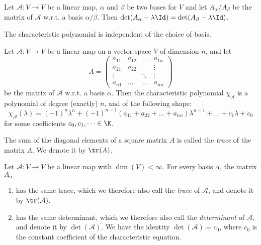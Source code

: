 \begin{theorem}
    Let $\mathcal{A}: V \to V$ be a linear map, $\alpha$ and $\beta$ be two bases for $V$ and let $A_\alpha/A_\beta$ be the matrix of $\mathcal{A}$ w.r.t. a basis $\alpha/\beta$. 
    Then $\det(A_\alpha - \lambda \Id) = \det(A_\beta - \lambda \Id)$.
\end{theorem}

\begin{remark}
    The characteristic polynomial is independent of the choice of basis.
\end{remark}

\begin{theorem}
    Let $\mathcal{A}: V \to V$ be a linear map on a vector space $V$ of dimension $n$, and let
    $$A = \begin{pmatrix} a_{11} & a_{12} & \dots & a_{1n} \\ 
                          a_{21} & a_{22} &       & \vdots \\
                          \vdots &        & \ddots & \vdots \\ a_{n1} & \dots & \dots & a_{nn} \end{pmatrix}$$
    be the matrix of $\mathcal{A}$ w.r.t. a basis $\alpha$. Then the characteristic polynomial $\chi_\mathcal{A}$ is a polynomial of degree (exactly) $n$, and of the following shape:
    $$\chi_\mathcal{A}(\lambda) = (-1)^n\lambda^n + (-1)^{n-1}(a_{11}+a_{22}+\dots+a_{nn})\lambda^{n-1} + \dots + c_1\lambda + c_0$$
    for some coefficients $c_0, c_1, \dots \in \K$.
\end{theorem}

\begin{definition}[Trace]
    The sum of the diagonal elements of a square matrix $A$ is called the \emph{trace} of the matrix $A$. We denote it by $\tr(A)$.
\end{definition}

\begin{theorem}
    Let $\mathcal{A}: V \to V$ be a linear map with $\dim(V) < \infty$. For every basis $\alpha$, the matrix $A_\alpha$
    \begin{enumerate}
        \item has the same trace, which we therefore also call the \emph{trace}  of $\mathcal{A}$, and denote it by $\tr(\mathcal{A})$. 
        \item has the same determinant, which we therefore also call the \emph{determinant} of $\mathcal{A}$, and denote it by $\det(\mathcal{A})$. We have the identity $\det(\mathcal{A}) = c_0$,
            where $c_0$ is the constant coefficient of the characteristic equation.
    \end{enumerate}
\end{theorem}

